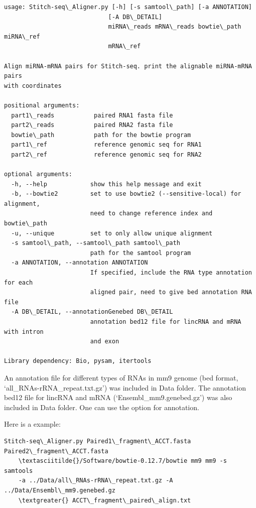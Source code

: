 \documentclass[letterpaper,10pt,english]{sphinxmanual}
\begin{document}
\begin{Verbatim}[commandchars=\\\{\}]
usage: Stitch-seq\_Aligner.py [-h] [-s samtool\_path] [-a ANNOTATION]
                             [-A DB\_DETAIL]
                             miRNA\_reads mRNA\_reads bowtie\_path miRNA\_ref
                             mRNA\_ref

Align miRNA-mRNA pairs for Stitch-seq. print the alignable miRNA-mRNA pairs
with coordinates

positional arguments:
  part1\_reads           paired RNA1 fasta file
  part2\_reads           paired RNA2 fasta file
  bowtie\_path           path for the bowtie program
  part1\_ref             reference genomic seq for RNA1
  part2\_ref             reference genomic seq for RNA2

optional arguments:
  -h, --help            show this help message and exit
  -b, --bowtie2         set to use bowtie2 (--sensitive-local) for alignment,
                        need to change reference index and bowtie\_path
  -u, --unique          set to only allow unique alignment
  -s samtool\_path, --samtool\_path samtool\_path
                        path for the samtool program
  -a ANNOTATION, --annotation ANNOTATION
                        If specified, include the RNA type annotation for each
                        aligned pair, need to give bed annotation RNA file
  -A DB\_DETAIL, --annotationGenebed DB\_DETAIL
                        annotation bed12 file for lincRNA and mRNA with intron
                        and exon

Library dependency: Bio, pysam, itertools
\end{Verbatim}

An annotation file for different types of RNAs in mm9 genome (bed format, `all\_RNAs-rRNA\_repeat.txt.gz') was included in Data folder. The annotation bed12 file for lincRNA and mRNA (`Ensembl\_mm9.genebed.gz') was also included in Data folder. One can use the option  for annotation.

Here is a example:

\begin{Verbatim}[commandchars=\\\{\}]
Stitch-seq\_Aligner.py Paired1\_fragment\_ACCT.fasta Paired2\_fragment\_ACCT.fasta
    \textasciitilde{}/Software/bowtie-0.12.7/bowtie mm9 mm9 -s samtools
    -a ../Data/all\_RNAs-rRNA\_repeat.txt.gz -A ../Data/Ensembl\_mm9.genebed.gz
    \textgreater{} ACCT\_fragment\_paired\_align.txt
\end{Verbatim}
\end{document}

